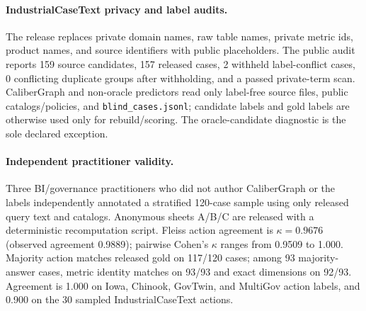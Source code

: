 \documentclass[letterpaper]{article}
\begin{document}
\paragraph{IndustrialCaseText privacy and label audits.}
The release replaces private domain names, raw table names, private metric ids, product names, and source identifiers with public placeholders. The public audit reports 159 source candidates, 157 released cases, 2 withheld label-conflict cases, 0 conflicting duplicate groups after withholding, and a passed private-term scan. CaliberGraph and non-oracle predictors read only label-free source files, public catalogs/policies, and \texttt{blind\_cases.jsonl}; candidate labels and gold labels are otherwise used only for rebuild/scoring. The oracle-candidate diagnostic is the sole declared exception.

\paragraph{Independent practitioner validity.}
Three BI/governance practitioners who did not author CaliberGraph or the labels independently annotated a stratified 120-case sample using only released query text and catalogs. Anonymous sheets A/B/C are released with a deterministic recomputation script. Fleiss action agreement is $\kappa{=}0.9676$ (observed agreement 0.9889); pairwise Cohen's $\kappa$ ranges from 0.9509 to 1.000. Majority action matches released gold on 117/120 cases; among 93 majority-answer cases, metric identity matches on 93/93 and exact dimensions on 92/93. Agreement is 1.000 on Iowa, Chinook, GovTwin, and MultiGov action labels, and 0.900 on the 30 sampled IndustrialCaseText actions.
\end{document}
